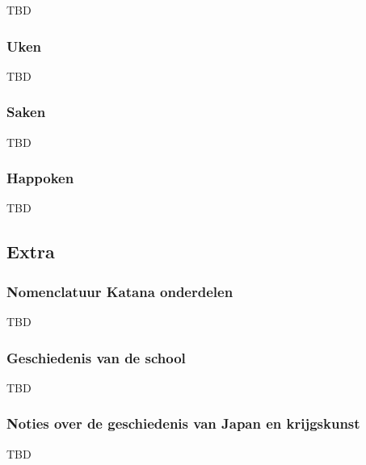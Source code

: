 TBD

\subsubsection{Uken}

TBD

\subsubsection{Saken}

TBD

\subsubsection{Happoken}

TBD

\subsection{Extra}

\subsubsection{Nomenclatuur Katana onderdelen}

TBD

\subsubsection{Geschiedenis van de school}

TBD

\subsubsection{Noties over de geschiedenis van Japan en krijgskunst}

TBD
